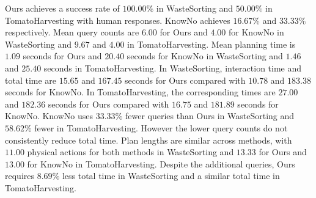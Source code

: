 Ours achieves a success rate of $100.00\%$ in WasteSorting and $50.00\%$ in TomatoHarvesting with human responses. KnowNo achieves $16.67\%$ and $33.33\%$ respectively. Mean query counts are $6.00$ for Ours and $4.00$ for KnowNo in WasteSorting and $9.67$ and $4.00$ in TomatoHarvesting. Mean planning time is $1.09$ seconds for Ours and $20.40$ seconds for KnowNo in WasteSorting and $1.46$ and $25.40$ seconds in TomatoHarvesting. In WasteSorting, interaction time and total time are $15.65$ and $167.45$ seconds for Ours compared with $10.78$ and $183.38$ seconds for KnowNo. In TomatoHarvesting, the corresponding times are $27.00$ and $182.36$ seconds for Ours compared with $16.75$ and $181.89$ seconds for KnowNo. KnowNo uses $33.33\%$ fewer queries than Ours in WasteSorting and $58.62\%$ fewer in TomatoHarvesting. However the lower query counts do not consistently reduce total time. Plan lengths are similar across methods, with $11.00$ physical actions for both methods in WasteSorting and $13.33$ for Ours and $13.00$ for KnowNo in TomatoHarvesting. Despite the additional queries, Ours requires $8.69\%$ less total time in WasteSorting and a similar total time in TomatoHarvesting.







